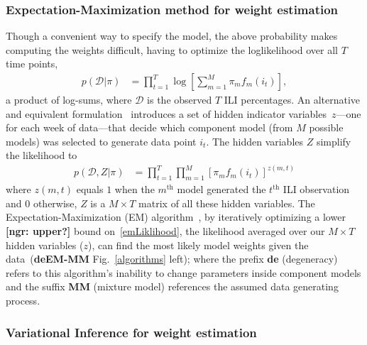 \documentclass[12pt]{article}
\def\l{\left}
\def\r{\right}
\def\ngr#1{{\small\color{Red}\textbf{[ngr: #1]}}}
\begin{document}
\subsubsection{Expectation-Maximization method for weight estimation}
Though a convenient way to specify the model, the above probability makes computing the weights difficult, having to optimize the loglikelihood over all $T$ time points,
\begin{equation}
  \begin{aligned}
    p(\mathcal{D} | \pi ) &= \prod_{t=1}^{T} \log\l[\sum_{m=1}^{M} \pi_m f_{m}(i_{t})\r],
  \end{aligned}
\end{equation}
a product of log-sums, where $\mathcal{D}$ is the observed $T$ ILI percentages.
An alternative and equivalent formulation~\cite{bishop2006pattern,murphy2012machine} introduces a set of hidden indicator variables~$z$---one for each week of data---that decide which component model (from $M$ possible models) was selected to generate data point $i_{t}$.
The hidden variables $Z$ simplify the likelihood to
\begin{equation}
  \begin{aligned}
    p(\mathcal{D},Z | \pi ) &= \prod_{t=1}^{T} \prod_{m=1}^{M} \l[\pi_m f_{m}(i_{t})\r]^{z(m,t)}\label{emLiklihood}
  \end{aligned}
\end{equation}
where $z(m,t)$ equals $1$ when the $m^{\text{th}}$ model generated the $t^{\text{th}}$ ILI observation and $0$ otherwise, $Z$ is a $M \times T$ matrix of all these hidden variables.
The Expectation-Maximization (EM) algorithm~\cite{dempster1977maximum,reich2019collaborativepnas}, by iteratively optimizing a lower \ngr{upper?} bound on~\eqref{emLiklihood}, the likelihood averaged over our $M \times T$ hidden variables ($z$), can find the most likely model weights given the data~(\textbf{deEM-MM} Fig.~\ref{algorithms} left); where the prefix \textbf{de} (degeneracy) refers to this algorithm's inability to change parameters inside component models and the suffix \textbf{MM} (mixture model) references the assumed data generating process.

 
\subsubsection{Variational Inference for weight estimation}
\end{document}
